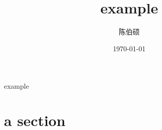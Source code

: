 \documentclass[slide]{myslide} %
\title{example}
\date{\today}
\author{陈伯硕}
\institute{github}
\begin{document}
\maketitle

\begin{frame}{example}
	\tableofcontents
\end{frame}

\section{a section}
\end{document}
